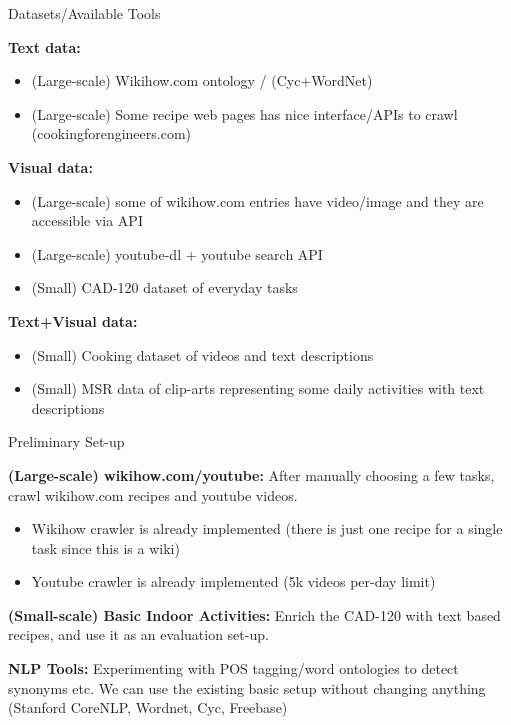 \begin{frame}{Datasets/Available Tools}

{\bf Text data:}
\begin{itemize}
\item (Large-scale) Wikihow.com ontology / (Cyc+WordNet)
\item (Large-scale) Some recipe web pages has nice interface/APIs to crawl (cookingforengineers.com)
\end{itemize}

{\bf Visual data:}
\begin{itemize}
\item (Large-scale) some of wikihow.com entries have video/image and they are accessible via API
\item (Large-scale) youtube-dl + youtube search API
\item (Small) CAD-120 dataset of everyday tasks
\end{itemize}

{\bf Text+Visual data:}
\begin{itemize}
\item (Small) Cooking dataset of videos and text descriptions
\item (Small) MSR data of clip-arts representing some daily activities with text descriptions  
\end{itemize}

\end{frame}


\begin{frame}{Preliminary Set-up}

{\bf (Large-scale) wikihow.com/youtube:} After manually choosing a few tasks, crawl wikihow.com recipes and youtube videos.
\begin{itemize}
\item Wikihow crawler is already implemented (there is just one recipe for a single task since this is a wiki)
\item Youtube crawler is already implemented (5k videos per-day limit)
\end{itemize}

{\bf (Small-scale) Basic Indoor Activities:} Enrich the CAD-120 with text based recipes, and use it as an evaluation set-up.

{\bf NLP Tools:} Experimenting with POS tagging/word ontologies to detect synonyms etc. We can use the existing basic setup without changing anything (Stanford CoreNLP, Wordnet, Cyc, Freebase)
\end{frame}



